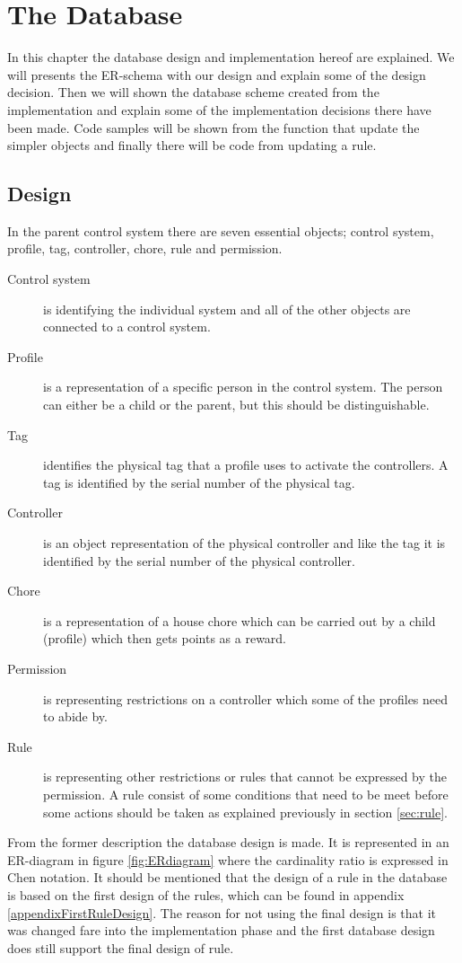 \chapter{The Database}
\label{chap:database} 
In this chapter the database design and implementation hereof are explained. We will presents the ER-schema with our design and explain some of the design decision. Then we will shown the database scheme created from the implementation and explain some of the implementation decisions there have been made. Code samples will be shown from the function that update the simpler objects and finally there will be code from updating a rule.  
  
\section{Design}
\label{sec:DBdesign}
In the parent control system there are seven essential objects; control system, profile, tag, controller, chore, rule and permission. 

\begin{description}
	\item[Control system] is identifying the individual system and all of the other objects are connected to a control system.
	\item[Profile] is a representation of a specific person in the control system. The person can either be a child or the parent, but this should be distinguishable.
	\item[Tag] identifies the physical tag that a profile uses to activate the controllers. A tag is identified by the serial number of the physical tag.
	\item[Controller]	is an object representation of the physical controller and like the tag it is identified by the serial number of the physical controller.
	\item[Chore] is a representation of a house chore which can be carried out by a child (profile) which then gets points as a reward.
	\item[Permission] is representing restrictions on a controller which some of the profiles need to abide by. 
	\item[Rule] is representing other restrictions or rules that cannot be expressed by the permission. A rule consist of some conditions that need to be meet before some actions should be taken as explained previously in section \vref{sec:rule}. 
\end{description}

From the former description the database design is made. It is represented in an ER-diagram in figure \ref{fig:ERdiagram} where the cardinality ratio is expressed in Chen notation\citep{DatabaseKilde}. It should be mentioned that the design of a rule in the database is based on the first design of the rules, which can be found in appendix \vref{appendixFirstRuleDesign}. The reason for not using the final design is that it was changed fare into the implementation phase and the first database design does still support the final design of rule. 

